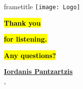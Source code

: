 \documentclass[aspectratio=169,11pt,xcolor=dvipsnames, t, onlytextwidth]{beamer}
\begin{document}
\begin{frame}[t, plain]{}
\setul{0.6ex}{0.15ex}

\begin{beamercolorbox}[right, sep=-5cm, ht=2.5cm, wd=\paperwidth]{frametitle}
        \texttt{[image: Logo]}
    \end{beamercolorbox}


\huge{\hl{\textbf{ Thank you }}}



\huge{\hl{\textbf{ for listening. }}}

\huge{\hl{\textbf{ Any questions? }}}

\vspace*{0.5cm}

\footnotesize{{\ul{\textbf{Iordanis Pantzartzis}}}}\\
\footnotesize{\insertinstitute, \insertdate}


\end{frame}
\end{document}
